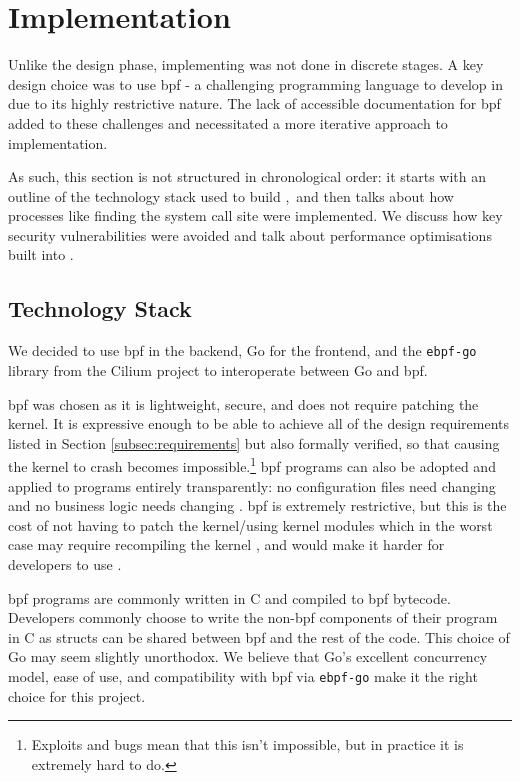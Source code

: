 \section{Implementation}\label{sec:implementation}

Unlike the design phase, implementing \af was not done in discrete
stages. A key design choice was to use \ac{bpf} - a challenging programming language
to develop in due to its highly restrictive nature. The lack of accessible
documentation for \ac{bpf} added to these challenges and necessitated a more
iterative approach to implementation.

As such, this section is not structured in chronological order: it starts with
an outline of the technology stack used to build \afss,~and then talks about how
processes like finding the system call site were implemented. We discuss 
how key security vulnerabilities were avoided and talk about performance 
optimisations built into \af.

\subsection{Technology Stack}\label{subsection:tech-stack}

We decided to use \ac{bpf} in the backend, Go for the frontend, and the
\texttt{ebpf-go} library from the Cilium project to interoperate between Go and
\ac{bpf}.

\ac{bpf} was chosen as it is lightweight, secure, and does not require 
patching the kernel. It is expressive enough to be able to achieve 
all of the design requirements listed in Section \ref{subsec:requirements} 
but also formally verified, so that causing the kernel to crash becomes
impossible.\footnote{Exploits and bugs mean that this isn't impossible, but in
practice it is extremely hard to do.} \ac{bpf} programs can also be adopted and
applied to programs entirely transparently: no configuration files need changing
and no business logic needs changing \cite{halinen-security-risks-sidecar-containers-2024}. \ac{bpf} is extremely restrictive, but
this is the cost of not having to patch the kernel/using kernel modules which in
the worst case may require recompiling the kernel
\cite{kbuild-modules-linux-kernel-docs-2025}, 
and would make it harder for developers to use \afss .

\ac{bpf} programs are commonly written in C and compiled to \ac{bpf} bytecode.
Developers commonly choose to write the non-\ac{bpf} components of their program
in C as structs can be shared between \ac{bpf} and the rest of the code.
This choice of Go may seem slightly unorthodox. We believe that Go's
excellent concurrency model, ease of use, and compatibility with \ac{bpf} via
\texttt{ebpf-go} make it the right choice for this project. 


